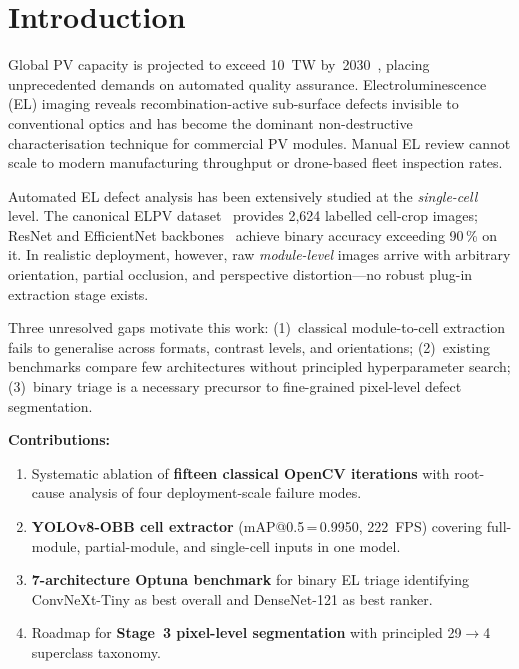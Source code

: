 \documentclass[conference]{IEEEtran}
\begin{document}
\section{Introduction}

Global PV capacity is projected to exceed 10~TW by~2030~\cite{iea2023}, placing unprecedented demands on automated quality assurance. Electroluminescence (EL) imaging reveals recombination-active sub-surface defects invisible to conventional optics and has become the dominant non-destructive characterisation technique for commercial PV modules. Manual EL review cannot scale to modern manufacturing throughput or drone-based fleet inspection rates.

Automated EL defect analysis has been extensively studied at the \textit{single-cell} level. The canonical ELPV dataset~\cite{deitsch2019} provides 2{,}624 labelled cell-crop images; ResNet and EfficientNet backbones~\cite{he2016,tan2019} achieve binary accuracy exceeding 90\,\% on it. In realistic deployment, however, raw \textit{module-level} images arrive with arbitrary orientation, partial occlusion, and perspective distortion---no robust plug-in extraction stage exists.

Three unresolved gaps motivate this work: (1)~classical module-to-cell extraction fails to generalise across formats, contrast levels, and orientations; (2)~existing benchmarks compare few architectures without principled hyperparameter search; (3)~binary triage is a necessary precursor to fine-grained pixel-level defect segmentation.

\textbf{Contributions:}
\begin{enumerate}
  \item Systematic ablation of \textbf{fifteen classical OpenCV iterations} with root-cause analysis of four deployment-scale failure modes.
  \item \textbf{YOLOv8-OBB cell extractor} (mAP@0.5\,=\,0.9950, 222~FPS) covering full-module, partial-module, and single-cell inputs in one model.
  \item \textbf{7-architecture Optuna benchmark} for binary EL triage identifying ConvNeXt-Tiny as best overall and DenseNet-121 as best ranker.
  \item Roadmap for \textbf{Stage~3 pixel-level segmentation} with principled 29$\to$4 superclass taxonomy.
\end{enumerate}

\end{document}
